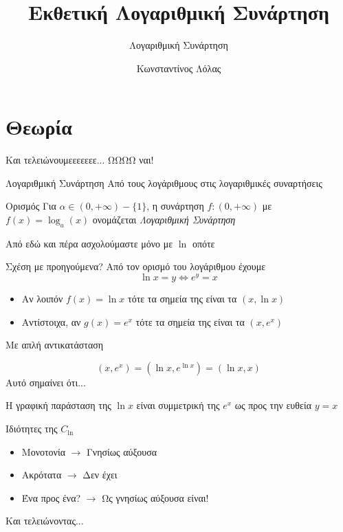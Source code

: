 \documentclass{presentation}
\title{Εκθετική Λογαριθμική Συνάρτηση}
\subtitle{Λογαριθμική Συνάρτηση}
\author[Λόλας]{Κωνσταντίνος Λόλας}
\date{}
\begin{document}
\begin{frame}
  \titlepage
\end{frame}

\section{Θεωρία}
\begin{frame}{Και τελειώνουμεεεεεεε...}
  ΩΩΩΩ ναι!
\end{frame}

\begin{frame}{Λογαριθμική Συνάρτηση}
  Από τους λογάριθμους στις λογαριθμικές συναρτήσεις
  \begin{block}{Ορισμός}
    Για $α\in (0,+\infty)-\{1\}$, η συνάρτηση $f:(0,+\infty)$ με $f(x)=\log_a(x)$ ονομάζεται \emph{Λογαριθμική Συνάρτηση}
  \end{block}
  Από εδώ και πέρα ασχολούμαστε μόνο με $\ln$ οπότε
\end{frame}

\begin{frame}{Σχέση με προηγούμενα?}
  Από τον ορισμό του λογάριθμου έχουμε
  $$\ln x=y\iff e^y=x$$
  \begin{itemize}
    \item Αν λοιπόν $f(x)=\ln x$ τότε τα σημεία της είναι τα $(x,\ln x)$
    \item Αντίστοιχα, αν $g(x)=e^x$ τότε τα σημεία της είναι τα $(x,e^x)$
  \end{itemize}
  Με απλή αντικατάσταση

  $$(x,e^x)=(\ln x, e^{\ln x})=(\ln x,x)$$
   {Αυτό σημαίνει ότι...}

   {Η γραφική παράσταση της $\ln x$ είναι συμμετρική της $e^x$ ως προς την ευθεία $y=x$}
\end{frame}

\begin{frame}{Ιδιότητες της $C_{\ln}$}
  \begin{itemize}
    \item Μονοτονία  {$\rightarrow$ Γνησίως αύξουσα}
    \item Ακρότατα  {$\rightarrow$ Δεν έχει}
    \item Ένα προς ένα?  {$\rightarrow$ Ως γνησίως αύξουσα είναι!}
  \end{itemize}
\end{frame}

\begin{frame}{Και τελειώνοντας...}

\end{frame}
\end{document}
